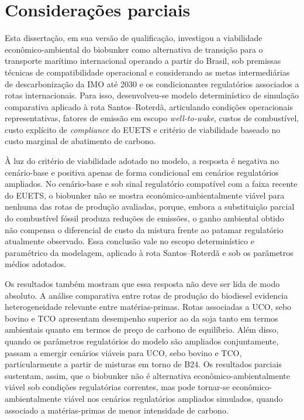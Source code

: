 \chapter{Considerações parciais}
\label{chap_conclusao}

Esta dissertação, em sua versão de qualificação, investigou a viabilidade econômico-ambiental do biobunker como alternativa de transição para o transporte marítimo internacional operando a partir do Brasil, sob premissas técnicas de compatibilidade operacional e considerando as metas intermediárias de descarbonização da \gls{IMO} até 2030 e os condicionantes regulatórios associados a rotas internacionais. Para isso, desenvolveu-se modelo determinístico de simulação comparativa aplicado à rota Santos--Roterdã, articulando condições operacionais representativas, fatores de emissão em escopo \emph{well-to-wake}, custos de combustível, custo explícito de \emph{compliance} do \gls{EUETS} e critério de viabilidade baseado no custo marginal de abatimento de carbono.

À luz do critério de viabilidade adotado no modelo, a resposta é negativa no cenário-base e positiva apenas de forma condicional em cenários regulatórios ampliados. No cenário-base e sob sinal regulatório compatível com a faixa recente do \gls{EUETS}, o biobunker não se mostra econômico-ambientalmente viável para nenhuma das rotas de produção avaliadas, porque, embora a substituição parcial do combustível fóssil produza reduções de emissões, o ganho ambiental obtido não compensa o diferencial de custo da mistura frente ao patamar regulatório atualmente observado. Essa conclusão vale no escopo determinístico e paramétrico da modelagem, aplicado à rota Santos--Roterdã e sob os parâmetros médios adotados.

Os resultados também mostram que essa resposta não deve ser lida de modo absoluto. A análise comparativa entre rotas de produção do biodiesel evidencia heterogeneidade relevante entre matérias-primas. Rotas associadas a \gls{UCO}, sebo bovino e \gls{TCO} apresentam desempenho superior ao da soja tanto em termos ambientais quanto em termos de preço de carbono de equilíbrio. Além disso, quando os parâmetros regulatórios do modelo são ampliados conjuntamente, passam a emergir cenários viáveis para \gls{UCO}, sebo bovino e \gls{TCO}, particularmente a partir de misturas em torno de \gls{B24}. Os resultados parciais sustentam, assim, que o biobunker não é alternativa econômico-ambientalmente viável sob condições regulatórias correntes, mas pode tornar-se econômico-ambientalmente viável nos cenários regulatórios ampliados simulados, quando associado a matérias-primas de menor intensidade de carbono.

